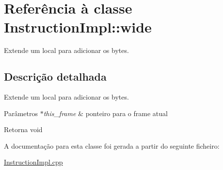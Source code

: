 \hypertarget{class_instruction_impl_1_1wide}{}\section{Referência à classe Instruction\+Impl\+:\+:wide}
\label{class_instruction_impl_1_1wide}


Extende um local para adicionar os bytes.  




\subsection{Descrição detalhada}
Extende um local para adicionar os bytes. 


\begin{DoxyParams}{Parâmetros}
{\em $\ast$this\+\_\+frame} & ponteiro para o frame atual \\
\hline
\end{DoxyParams}
\begin{DoxyReturn}{Retorna}
void 
\end{DoxyReturn}


A documentação para esta classe foi gerada a partir do seguinte ficheiro\+:\begin{DoxyCompactItemize}
\item 
\hyperlink{_instruction_impl_8cpp}{Instruction\+Impl.\+cpp}\end{DoxyCompactItemize}
